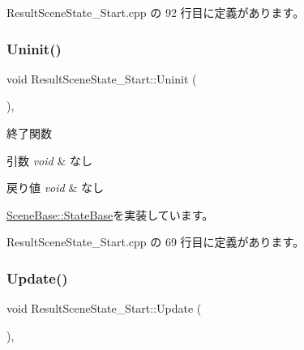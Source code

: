  Result\+Scene\+State\+\_\+\+Start.\+cpp の 92 行目に定義があります。

\mbox{\label{class_result_scene_state___start_af5b9af607074e3296481a1660607fb9a}} 
\subsubsection{\texorpdfstring{Uninit()}{Uninit()}}
{\footnotesize\ttfamily void Result\+Scene\+State\+\_\+\+Start\+::\+Uninit (\begin{DoxyParamCaption}{ }\end{DoxyParamCaption})\hspace{0.3cm}{\ttfamily [override]}, {\ttfamily [virtual]}}



終了関数 


\begin{DoxyParams}{引数}
{\em void} & なし \\
\hline
\end{DoxyParams}

\begin{DoxyRetVals}{戻り値}
{\em void} & なし \\
\hline
\end{DoxyRetVals}


\mbox{\hyperlink{class_scene_base_1_1_state_base_a2763fa37e45b39bd8d3bbb735c76c59b}{Scene\+Base\+::\+State\+Base}}を実装しています。



 Result\+Scene\+State\+\_\+\+Start.\+cpp の 69 行目に定義があります。

\mbox{\label{class_result_scene_state___start_a2ecdef2bef0cd1a04055e8687e11199b}} 
\subsubsection{\texorpdfstring{Update()}{Update()}}
{\footnotesize\ttfamily void Result\+Scene\+State\+\_\+\+Start\+::\+Update (\begin{DoxyParamCaption}{ }\end{DoxyParamCaption})\hspace{0.3cm}{\ttfamily [override]}, {\ttfamily [virtual]}}



